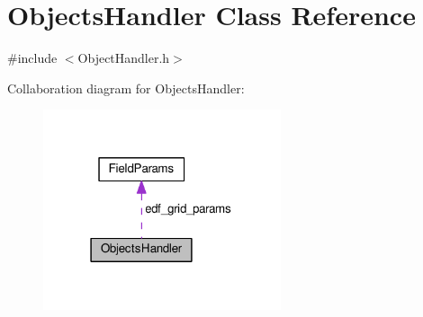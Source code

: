 \hypertarget{class_objects_handler}{}\section{Objects\+Handler Class Reference}
\label{class_objects_handler}


{\ttfamily \#include $<$Object\+Handler.\+h$>$}



Collaboration diagram for Objects\+Handler\+:\nopagebreak
\begin{figure}[H]
\begin{center}
\leavevmode
\includegraphics[width=198pt]{class_objects_handler__coll__graph}
\end{center}
\end{figure}

